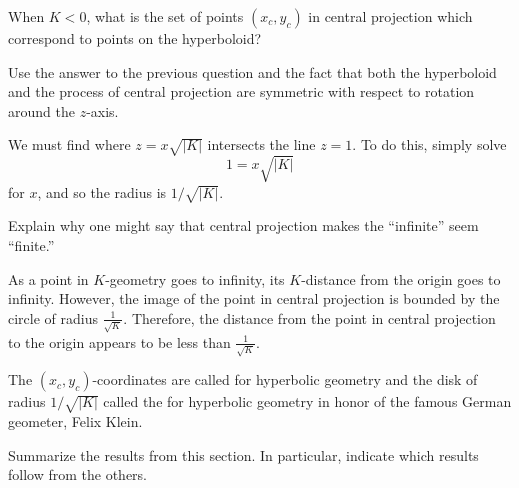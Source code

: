 \documentclass[newpage,hints,handout,12pt,noauthor,nooutcomes]{ximera}
\begin{document}
\begin{problem}
  When $K<0$, what is the set of points $(x_c,y_c)$ in central projection which
  correspond to points on the hyperboloid?
  \begin{hint}
    Use the answer to the previous question and the fact that both the
    hyperboloid and the process of central projection are symmetric with respect
    to rotation around the $z$-axis.
  \end{hint}
  \begin{freeResponse}
    We must find where $z = x\sqrt{|K|}$ intersects the line $z=1$. To do this, simply solve
    \[
    1 = x\sqrt{|K|}
    \]
    for $x$, and so the radius is $1/\sqrt{|K|}$.
  \end{freeResponse}
\end{problem}

\begin{problem}
  Explain why one might say that central projection makes the
  ``infinite'' seem ``finite.''
    \begin{freeResponse}
    As a point in $K$-geometry goes to infinity, its $K$-distance from the origin goes to infinity. However, the image of the point in central projection is bounded by the circle of radius $\frac{1}{\sqrt{K}}$. Therefore, the distance from the point in central projection to the origin appears to be less than $\frac{1}{\sqrt{K}}$.
    \end{freeResponse}
\end{problem}

The $(x_{c},y_{c})$-coordinates are called  for
hyperbolic geometry and the disk of radius $1/\sqrt{|K|}$ called the
 for hyperbolic geometry in honor of the famous
German geometer, Felix Klein.

\begin{problem}
Summarize the results from this section. In particular, indicate which
results follow from the others.
\begin{freeResponse}
\end{freeResponse}
\end{problem}
\end{document}
